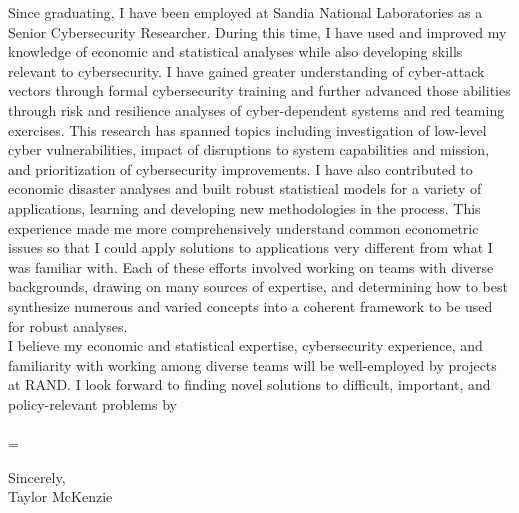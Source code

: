 \documentclass[]{article}
\begin{document}
Since graduating, I have been employed at Sandia National Laboratories as a Senior Cybersecurity Researcher. During this time, I have used and improved my knowledge of economic and statistical analyses while also developing skills relevant to cybersecurity. I have gained greater understanding of cyber-attack vectors through formal cybersecurity training and further advanced those abilities through risk and resilience analyses of cyber-dependent systems and red teaming exercises. This research has spanned topics including investigation of low-level cyber vulnerabilities, impact of disruptions to system capabilities and mission, and prioritization of cybersecurity improvements. I have also contributed to economic disaster analyses and built robust statistical models for a variety of applications, learning and developing new methodologies in the process. This experience made me more comprehensively understand common econometric issues so that I could apply solutions to applications very different from what I was familiar with. Each of these efforts involved working on teams with diverse backgrounds, drawing on many sources of expertise, and determining how to best synthesize numerous and varied concepts into a coherent framework to be used for robust analyses.\\

I believe my economic and statistical expertise, cybersecurity experience, and familiarity with working among diverse teams will be well-employed by projects at RAND. I look forward to finding novel solutions to difficult, important, and policy-relevant problems by \\\\=


\noindent Sincerely,\\

\noindent Taylor McKenzie
\end{document}
